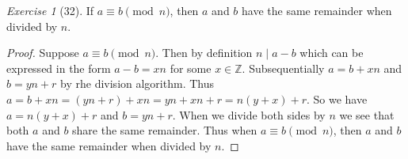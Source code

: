 \documentclass[12pt]{amsart}
\theoremstyle{remark}
\newtheorem*{exercise}{Exercise}%
\def\ZZ{\ensuremath{\mathbb Z}}
\theoremstyle{mycomment}
\begin{document}
\begin{exercise}[32] If $a\equiv b\pmod n$, then $a$ and $b$ have the same remainder when divided by $n$.
\begin{proof}
Suppose $a \equiv b \pmod n$. Then by definition $n \mid a - b $ which can be expressed in the form $a - b = xn$ for some $x \in \ZZ$. Subsequentially $a = b + xn$ and $b = yn + r$ by rhe division algorithm. Thus $a = b + xn = (yn + r) + xn = yn + xn + r = n(y + x) + r$. So we have $a = n(y+x) + r$ and $b = yn + r$. When we divide both sides by $n$ we see that both $a$ and $b$ share the same remainder. Thus when $a \equiv b \pmod n$, then $a$ and $b$ have the same remainder when divided by $n$.
\end{proof}
\end{exercise}





 
\end{document}
